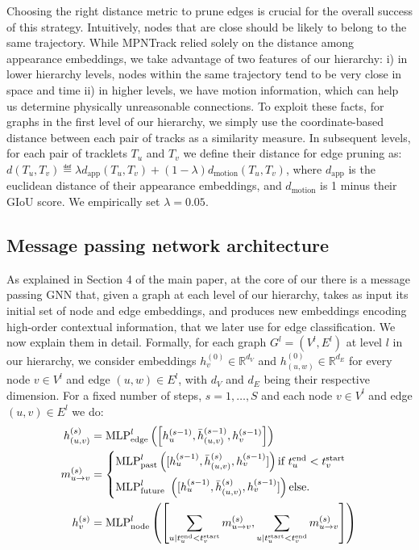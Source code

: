 \documentclass[10pt,twocolumn,letterpaper]{article}
\begin{document}
{{Choosing the right distance metric to prune edges is crucial for the overall success of this strategy. Intuitively, nodes that are close should be likely to belong to the same trajectory. While MPNTrack relied solely on the distance among appearance embeddings, we take advantage of two features of our hierarchy: i) in lower hierarchy levels, nodes within the same trajectory tend to be very close in space and time ii) in higher levels, we have motion information, which can help us determine physically unreasonable connections. To exploit these facts, for graphs in the first level of our hierarchy, we simply use the coordinate-based distance between each pair of tracks as a similarity measure. In subsequent levels, for each pair of tracklets $T_u$ and $T_v$ we define their distance for edge pruning as: $d(T_u, T_v)\eqdef \lambda d_{\text{app}}(T_u, T_v) + (1-\lambda) d_{\text{motion}}(T_u, T_v)$, where $d_{\text{app}}$ is the euclidean distance of their appearance embeddings, and $d_{\text{motion}}$ is 1 minus their GIoU score. We empirically set $\lambda = 0.05$.

\subsection{Message passing network architecture}
As explained in Section 4 of the main paper, at the core of our \blocknameplural there is a message passing GNN that, given a graph at each level of our hierarchy, takes as input its initial set of node and edge embeddings, and produces new embeddings encoding high-order contextual information, that we later use for edge classification. We now explain them in detail. Formally, for each graph $G^l=(V^l, E^l)$ at level $l$ in our hierarchy, we consider embeddings $h^{(0)}_v\in \mathbb{R}^{d_V}$ and $h^{(0)}_{(u, w)}\in \mathbb{R}^{d_E}$ for every node $v\in V^l$ and edge $(u, w)\in E^l$, with $d_V$ and $d_E$ being their respective dimension. 
For a fixed number of steps, $s=1, \dots, S$ and each node $v\in V^l$ and edge $(u, v) \in E^l$ we do:
\begin{align}
h_{(u, v)}^{(s)} &=  {\text{MLP}}^l_{\text{edge}}\left( \left[ h_{u}^{(s-1)}, \bar{h}_{(u, v)}^{(s-1)}, h_{v}^{(s-1)} \right] \right) \\  
m_{u\rightarrow v}^{(s)} &=\begin{cases} 
            {\text{MLP}}^l_{\text{past}}\left([h_u^{(s-1)}, \bar{h}_{(u, v)}^{(s)}, h_{v}^{(s-1)}]\right) \text{if } t_u^\text{end}<t_v^\text{start}\\[7pt]
            {\text{MLP}}^l_{\text{future}} \text{ }\left([h_u^{(s-1)}, \bar{h}_{(u, v)}^{(s)}, h_{v}^{(s-1)}]\right) \text{else}.  
          \end{cases}\\
h_v^{(s)} &=  {\text{MLP}}^l_{\text{node}}\left ( \left [ \sum_{u|t_u^\text{end}<t_v^\text{start}} m^{(s)}_{u\rightarrow v},\sum_{u| t_u^\text{start}<t_v^\text{end}} m^{(s)}_{    u\rightarrow v} \right ] \right ) 
\end{align}

}}
\end{document}
